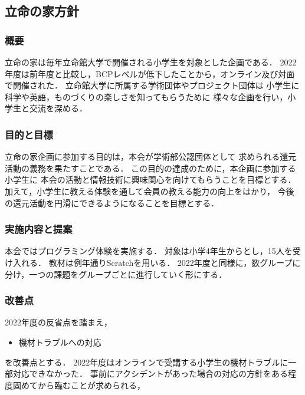 \subsection*{立命の家方針}



\subsubsection*{概要}
立命の家は毎年立命館大学で開催される小学生を対象とした企画である．
2022年度は前年度と比較し，BCPレベルが低下したことから，オンライン及び対面で開催された．
立命館大学に所属する学術団体やプロジェクト団体は
小学生に科学や英語，ものづくりの楽しさを知ってもらうために
様々な企画を行い，小学生と交流を深める．

\subsubsection*{目的と目標}
立命の家企画に参加する目的は，本会が学術部公認団体として
求められる還元活動の義務を果たすことである．
この目的の達成のために，本企画に参加する小学生に
本会の活動と情報技術に興味関心を向けてもらうことを目標とする．
加えて，小学生に教える体験を通して会員の教える能力の向上をはかり，
今後の還元活動を円滑にできるようになることを目標とする．

\subsubsection*{実施内容と提案}
本会ではプログラミング体験を実施する．
対象は小学4年生からとし，15人を受け入れる．
教材は例年通りScratchを用いる．
2022年度と同様に，数グループに分け，一つの課題をグループごとに進行していく形にする．

\subsubsection*{改善点}
2022年度の反省点を踏まえ，
\begin{itemize}
  \item 機材トラブルへの対応
\end{itemize}
を改善点とする．
2022年度はオンラインで受講する小学生の機材トラブルに一部対応できなかった．
事前にアクシデントがあった場合の対応の方針をある程度固めてから臨むことが求められる，

